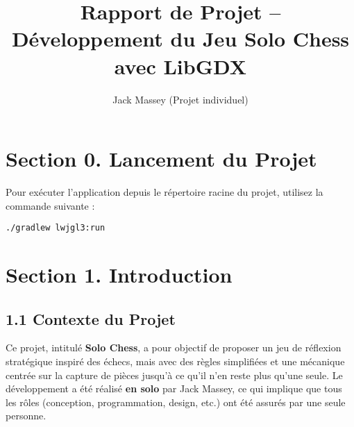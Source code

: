 \documentclass[11pt,a4paper]{article}
\title{Rapport de Projet – Développement du Jeu Solo Chess avec LibGDX}
\author{Jack Massey (Projet individuel)}
\date{}
\begin{document}
\maketitle

\section*{Section 0. Lancement du Projet}

Pour exécuter l’application depuis le répertoire racine du projet, utilisez la commande suivante :
\begin{verbatim}
./gradlew lwjgl3:run
\end{verbatim}

\section*{Section 1. Introduction}

\subsection*{1.1 Contexte du Projet}
Ce projet, intitulé \textbf{Solo Chess}, a pour objectif de proposer un jeu de réflexion stratégique inspiré des échecs, mais avec des règles simplifiées et une mécanique centrée sur la capture de pièces jusqu’à ce qu’il n’en reste plus qu’une seule. Le développement a été réalisé \textbf{en solo} par Jack Massey, ce qui implique que tous les rôles (conception, programmation, design, etc.) ont été assurés par une seule personne.
\end{document}
